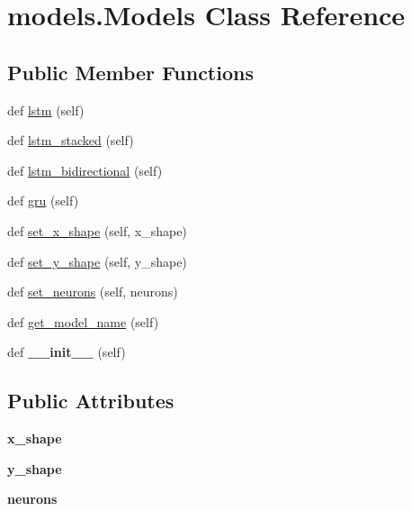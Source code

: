 \hypertarget{classmodels_1_1Models}{}\section{models.\+Models Class Reference}
\label{classmodels_1_1Models}
\subsection*{Public Member Functions}
\begin{DoxyCompactItemize}
\item 
def \hyperlink{classmodels_1_1Models_a2cb0bdd9f6937643d149f60a2c02b667}{lstm} (self)
\item 
def \hyperlink{classmodels_1_1Models_a4c0aa722dfc125b749594382b8547f2f}{lstm\+\_\+stacked} (self)
\item 
def \hyperlink{classmodels_1_1Models_ae53538a386b08e112d6a7b82ec27eb09}{lstm\+\_\+bidirectional} (self)
\item 
def \hyperlink{classmodels_1_1Models_a74e3aab482c7db13cfe8b906c2fc69bd}{gru} (self)
\item 
def \hyperlink{classmodels_1_1Models_a8f0f9abd97b5a4fb6453a05baff20d14}{set\+\_\+x\+\_\+shape} (self, x\+\_\+shape)
\item 
def \hyperlink{classmodels_1_1Models_a1a6e98441b743361bc53da03ccc4ac19}{set\+\_\+y\+\_\+shape} (self, y\+\_\+shape)
\item 
def \hyperlink{classmodels_1_1Models_a188d50d7b64d7ab545be9a434e6e7c19}{set\+\_\+neurons} (self, neurons)
\item 
def \hyperlink{classmodels_1_1Models_a614dccfc44ed674cbe83fbdb3f8e7461}{get\+\_\+model\+\_\+name} (self)
\item 
\mbox{\label{classmodels_1_1Models_a359d06c6bf5ddad46b50fddfe43c8f5b}} 
def {\bfseries \+\_\+\+\_\+init\+\_\+\+\_\+} (self)
\end{DoxyCompactItemize}
\subsection*{Public Attributes}
\begin{DoxyCompactItemize}
\item 
\mbox{\label{classmodels_1_1Models_aaed9b2c62c051b46a237c13e866b0318}} 
{\bfseries x\+\_\+shape}
\item 
\mbox{\label{classmodels_1_1Models_a624ac5bbac787bfafbc1dafb08ce2cc5}} 
{\bfseries y\+\_\+shape}
\item 
\mbox{\label{classmodels_1_1Models_af910282db7339b39a4928b125a3419a6}} 
{\bfseries neurons}
\end{DoxyCompactItemize}
